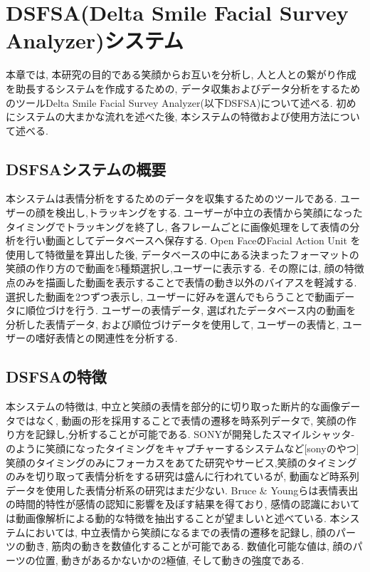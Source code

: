 \chapter{DSFSA(Delta Smile Facial Survey Analyzer)システム}
\label{chap:aboutDSFSA}

本章では, 本研究の目的である笑顔からお互いを分析し, 人と人との繋がり作成を助長するシステムを作成するための,
データ収集およびデータ分析をするためのツールDelta Smile Facial Survey Analyzer(以下DSFSA)について述べる.
初めにシステムの大まかな流れを述べた後, 本システムの特徴および使用方法について述べる.


\section{DSFSAシステムの概要}
本システムは表情分析をするためのデータを収集するためのツールである.
ユーザーの顔を検出し,トラッキングをする.
ユーザーが中立の表情から笑顔になったタイミングでトラッキングを終了し,
各フレームごとに画像処理をして表情の分析を行い動画としてデータベースへ保存する.
Open FaceのFacial Action Unit を使用して特徴量を算出した後,
データベースの中にある決まったフォーマットの笑顔の作り方ので動画を5種類選択し,ユーザーに表示する.
その際には, 顔の特徴点のみを描画した動画を表示することで表情の動き以外のバイアスを軽減する.
選択した動画を2つずつ表示し, ユーザーに好みを選んでもらうことで動画データに順位づけを行う.
ユーザーの表情データ, 選ばれたデータベース内の動画を分析した表情データ, および順位づけデータを使用して,
ユーザーの表情と, ユーザーの嗜好表情との関連性を分析する.

\section{DSFSAの特徴}
本システムの特徴は, 中立と笑顔の表情を部分的に切り取った断片的な画像データではなく,
動画の形を採用することで表情の遷移を時系列データで, 笑顔の作り方を記録し,分析することが可能である.
SONYが開発したスマイルシャッタ-のように笑顔になったタイミングをキャプチャーするシステムなど[sonyのやつ]
笑顔のタイミングのみにフォーカスをあてた研究やサービス,笑顔のタイミングのみを切り取って表情分析をする研究は盛んに行われているが,
動画など時系列データを使用した表情分析系の研究はまだ少ない.
Bruce \& Youngらは表情表出の時間的特性が感情の認知に影響を及ぼす結果を得ており,
感情の認識においては動画像解析による動的な特徴を抽出することが望ましいと述べている.\cite{KOkata} \cite{yukiTakahasshi}
本システムにおいては, 中立表情から笑顔になるまでの表情の遷移を記録し,
顔のパーツの動き, 筋肉の動きを数値化することが可能である.
数値化可能な値は, 顔のパーツの位置, 動きがあるかないかの2極値, そして動きの強度である.

